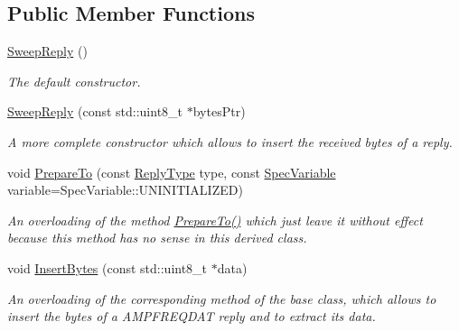 \subsection*{Public Member Functions}
\begin{DoxyCompactItemize}
\item 
\hyperlink{classSweepReply_a27d588db63e7c9d5374cfbfc88d9bc4f}{Sweep\+Reply} ()
\begin{DoxyCompactList}\small\item\em The default constructor. \end{DoxyCompactList}\item 
\mbox{\label{classSweepReply_a64fa7237d721d3dc95a06f145a0e7a7d}} 
\hyperlink{classSweepReply_a64fa7237d721d3dc95a06f145a0e7a7d}{Sweep\+Reply} (const std\+::uint8\+\_\+t $\ast$bytes\+Ptr)
\begin{DoxyCompactList}\small\item\em A more complete constructor which allows to insert the received bytes of a reply. \end{DoxyCompactList}\item 
\mbox{\label{classSweepReply_a513705c42bec154f66f75903813a5db1}} 
void \hyperlink{classSweepReply_a513705c42bec154f66f75903813a5db1}{Prepare\+To} (const \hyperlink{classReply_aa873dec4817ed08a5212ec3ba2b5c807}{Reply\+Type} type, const \hyperlink{Spectran_8h_a0411392c90f0c8f0d8e44a4e94259276}{Spec\+Variable} variable=Spec\+Variable\+::\+U\+N\+I\+N\+I\+T\+I\+A\+L\+I\+Z\+ED)
\begin{DoxyCompactList}\small\item\em An overloading of the method {\ttfamily \hyperlink{classSweepReply_a513705c42bec154f66f75903813a5db1}{Prepare\+To()}} which just leave it without effect because this method has no sense in this derived class. \end{DoxyCompactList}\item 
void \hyperlink{classSweepReply_a8eff11f046d6cd2fb8c3987f889c5d11}{Insert\+Bytes} (const std\+::uint8\+\_\+t $\ast$data)
\begin{DoxyCompactList}\small\item\em An overloading of the corresponding method of the base class, which allows to insert the bytes of a A\+M\+P\+F\+R\+E\+Q\+D\+AT reply and to extract its data. \end{DoxyCompactList}\item 
\mbox{\label{classSweepReply_a47ccfb08ddaa045ad170ce3583548ff2}} 

\end{DoxyCompactItemize}
